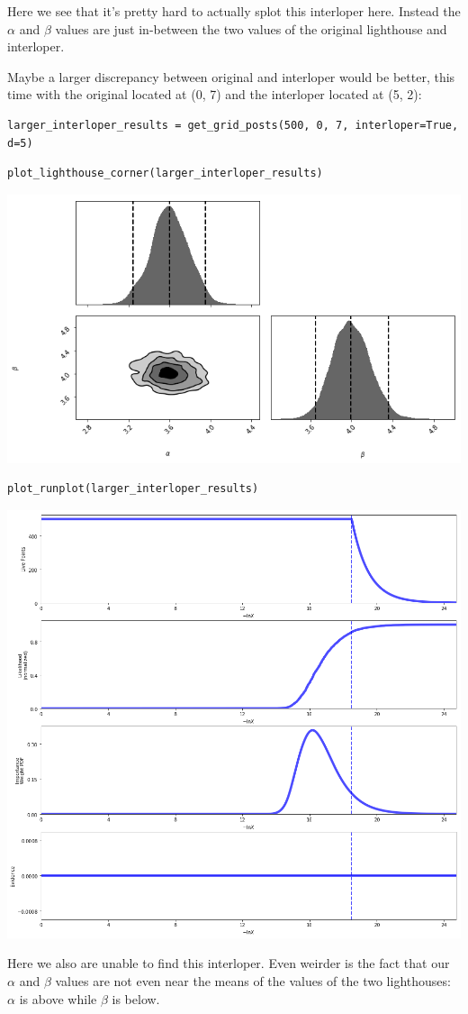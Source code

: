 \documentclass[11pt]{article}
\begin{document}
Here we see that it's pretty hard to actually splot this interloper
here. Instead the $\alpha$ and $\beta$ values are just in-between the two values of
the original lighthouse and interloper.

Maybe a larger discrepancy between original and interloper would be better,
this time with the original located at (0, 7) and the interloper located at (5,
2):

\begin{verbatim}
larger_interloper_results = get_grid_posts(500, 0, 7, interloper=True, d=5)
\end{verbatim}


\begin{verbatim}
plot_lighthouse_corner(larger_interloper_results)
\end{verbatim}

\includegraphics[width=.9\linewidth]{./obipy-resources/692sTa.png}

\begin{verbatim}
plot_runplot(larger_interloper_results)
\end{verbatim}

\includegraphics[width=.9\linewidth]{./obipy-resources/692TAV.png}

Here we also are unable to find this interloper. Even weirder is the fact that
our $\alpha$ and $\beta$ values are not even near the means of the values of the
two lighthouses: $\alpha$ is above while $\beta$ is below.
\end{document}

